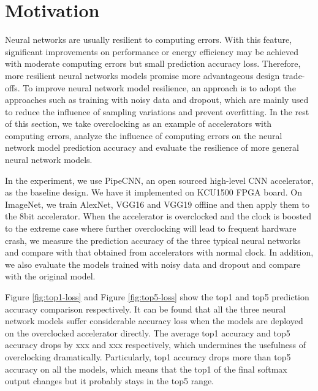 \section{Motivation} \label{sec:motivation}
Neural networks are usually resilient to computing errors. With this feature, 
significant improvements on performance or energy efficiency may be 
achieved with moderate computing errors but small prediction accuracy loss.
Therefore, more resilient neural networks models promise more advantageous 
design trade-offs. To improve neural network model resilience, an  approach is to adopt 
the approaches such as training with noisy data and dropout, which are mainly 
used to reduce the influence of sampling variations and prevent overfitting. 
In the rest of this section, we take overclocking as an example of accelerators 
with computing errors, analyze the influence of computing errors on 
the neural network model prediction accuracy and evaluate the resilience of 
more general neural network models.

In the experiment, we use PipeCNN\cite{pipecnn_2}, an open sourced high-level CNN accelerator, 
as the baseline design. We have it implemented on KCU1500 FPGA board. 
On ImageNet, we train AlexNet, VGG16 and VGG19 offline and then apply them to the 8bit accelerator. 
When the accelerator is overclocked and the clock is boosted to the extreme case where 
further overclocking will lead to frequent hardware crash, we measure the prediction accuracy of 
the three typical neural networks and compare with that obtained from accelerators with normal 
clock. In addition, we also evaluate the models trained with noisy data and dropout and 
compare with the original model.

Figure \ref{fig:top1-loss} and Figure \ref{fig:top5-loss} show the top1 and top5 prediction accuracy comparison 
respectively. It can be found that all the three neural network models suffer considerable accuracy loss 
when the models are deployed on the overclocked accelerator directly. The average top1 accuracy and top5 accuracy 
drops by xxx and xxx respectively, which undermines the usefulness of overclocking dramatically.
Particularly, top1 accuracy drops more than top5 accuracy on all the 
models, which means that the top1 of the final softmax output changes but it probably 
stays in the top5 range. 

